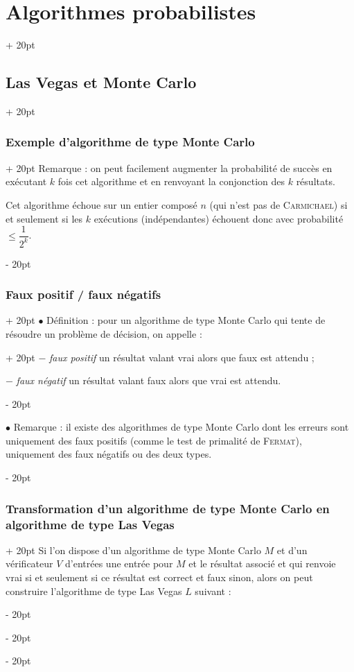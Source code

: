 \documentclass[a4paper, 12pt, twoside]{article}
\newenvironment{indalgo}[2][H]{
    \begin{algoBox}
        \begin{algorithm}[#1]
            \caption{#2}
}
{
        \end{algorithm}
    \end{algoBox}
}
\renewcommand{\le}{\leqslant}
\newcommand{\ind}[1][20pt]{\advance\leftskip + #1}
\newcommand{\deind}[1][20pt]{\advance\leftskip - #1}
\newenvironment{indt}[2][20pt]{#2 \par \ind[#1]}{\par \deind} %
\newcommand{\1}{\mathbbm 1}
\begin{document}
\begin{indt}{\section{Algorithmes probabilistes}}
\begin{indt}{\subsection{Las Vegas et Monte Carlo}}
\begin{indt}{\subsubsection{Exemple d'algorithme de type Monte Carlo}}
                Remarque : on peut facilement augmenter la probabilité de succès en exécutant $k$ fois cet algorithme et en renvoyant la conjonction des $k$ résultats.

                Cet algorithme échoue sur un entier composé $n$ (qui n'est pas de \textsc{Carmichael}) si et seulement si les $k$ exécutions (indépendantes) échouent donc avec probabilité $\le \dfrac{1}{2^k}$.
            \end{indt}

            \vspace{12pt}
            
            \begin{indt}{\subsubsection{Faux positif / faux négatifs}}
                \begin{indt}{$\bullet$ Définition : pour un algorithme de type Monte Carlo qui tente de résoudre un problème de décision, on appelle :}
                    $-$ \emph{faux positif} un résultat valant vrai alors que faux est attendu ;

                    $-$ \emph{faux négatif} un résultat valant faux alors que vrai est attendu.
                \end{indt}

                \vspace{12pt}
                
                $\bullet$ Remarque : il existe des algorithmes de type Monte Carlo dont les erreurs sont uniquement des faux positifs (comme le test de primalité de \textsc{Fermat}), uniquement des faux négatifs ou des deux types.
            \end{indt}

            \vspace{12pt}
            
            \begin{indt}{\subsubsection{Transformation d'un algorithme de type Monte Carlo en algorithme de type Las Vegas}}
                Si l'on dispose d'un algorithme de type Monte Carlo $M$ et d'un vérificateur $V$ d'entrées une entrée pour $M$ et le résultat associé et qui renvoie vrai si et seulement si ce résultat est correct et faux sinon, alors on peut construire l'algorithme de type Las Vegas $L$ suivant :
                \begin{indalgo}{$L$, algorithme Las Vegas associé à l'algorithme Monte Carlo $M$}


\end{indalgo}
\end{indt}
\end{indt}
\end{indt}
\end{document}
